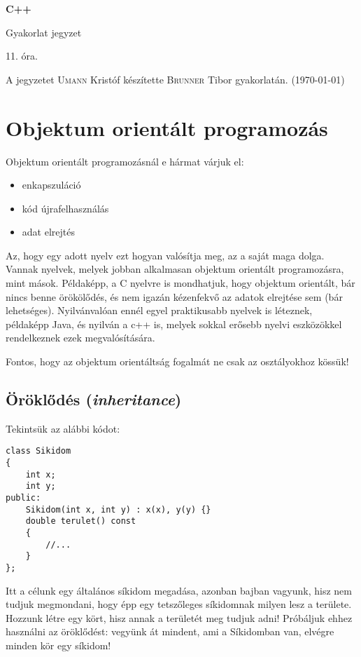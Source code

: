 \documentclass[a4paper,11.5pt,table]{article}
\begin{document}
	\setlength\parindent{0pt}
	\def\<{<\hspace{0mm}<}
	
	\theoremstyle{definition}
	\newtheorem{note}{Megjegyzés}[subsection]
	
	\begin{center}
		{\LARGE\textbf{C++}}
		
		{\Large Gyakorlat jegyzet}
		
		11. óra.
	\end{center}
	A jegyzetet \textsc{Umann} Kristóf készítette \textsc{Brunner} Tibor gyakorlatán. (\today)
	\section{Objektum orientált programozás}
	Objektum orientált programozásnál e hármat várjuk el:
	\begin{itemize}
		\item enkapszuláció
		\item kód újrafelhasználás
		\item adat elrejtés
	\end{itemize}
	Az, hogy egy adott nyelv ezt hogyan valósítja meg, az a saját maga dolga. Vannak nyelvek, melyek jobban alkalmasan objektum orientált programozásra, mint mások. Példaképp, a C nyelvre is mondhatjuk, hogy objektum orientált, bár nincs benne örökölődés, és nem igazán kézenfekvő az adatok elrejtése sem (bár lehetséges). Nyilvánvalóan ennél egyel praktikusabb nyelvek is léteznek, példaképp Java, és nyilván a c++ is, melyek sokkal erősebb nyelvi eszközökkel rendelkeznek ezek megvalósítására.
	
	Fontos, hogy az objektum orientáltság fogalmát ne csak az osztályokhoz kössük!
	
	\subsection{Öröklődés (\textit{inheritance})}
	Tekintsük az alábbi kódot:
	\begin{lstlisting}
class Sikidom
{
	int x;
	int y;
public:
	Sikidom(int x, int y) : x(x), y(y) {}
	double terulet() const
	{
		//...
	}
};
	\end{lstlisting}
	Itt a célunk egy általános síkidom megadása, azonban bajban vagyunk, hisz nem tudjuk megmondani, hogy épp egy tetszőleges síkidomnak milyen lesz a területe. Hozzunk létre egy kört, hisz annak a területét meg tudjuk adni! Próbáljuk ehhez használni az öröklődést: vegyünk át mindent, ami a Síkidomban van, elvégre minden kör egy síkidom!
	
\end{document}
